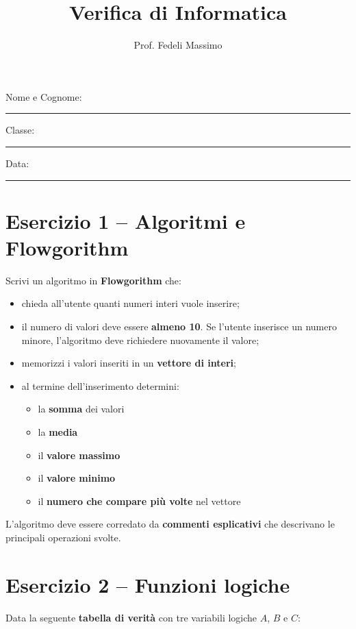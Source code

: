 \documentclass[a4paper,12pt]{article}
\title{Verifica di Informatica}
\author{Prof. Fedeli Massimo}
\date{}
\begin{document}
	
	\maketitle
	
	Nome e Cognome: \rule{8cm}{0.4pt}
	
	Classe: \rule{3cm}{0.4pt} \hfill Data: \rule{3cm}{0.4pt}
	
	\vspace{1cm}
	
	\section*{Esercizio 1 – Algoritmi e Flowgorithm}
	
	Scrivi un algoritmo in \textbf{Flowgorithm} che:
	
	\begin{itemize}
		\item chieda all'utente quanti numeri interi vuole inserire;
		\item il numero di valori deve essere \textbf{almeno 10}. Se l'utente inserisce un numero minore, l'algoritmo deve richiedere nuovamente il valore;
		\item memorizzi i valori inseriti in un \textbf{vettore di interi};
		\item al termine dell'inserimento determini:
		\begin{itemize}
			\item la \textbf{somma} dei valori
			\item la \textbf{media}
			\item il \textbf{valore massimo}
			\item il \textbf{valore minimo}
			\item il \textbf{numero che compare più volte} nel vettore
		\end{itemize}
	\end{itemize}
	
	L'algoritmo deve essere corredato da \textbf{commenti esplicativi} che descrivano le principali operazioni svolte.
	
	\vspace{1cm}
	
	\section*{Esercizio 2 – Funzioni logiche}
	
	Data la seguente \textbf{tabella di verità} con tre variabili logiche \(A\), \(B\) e \(C\):
	
\end{document}
